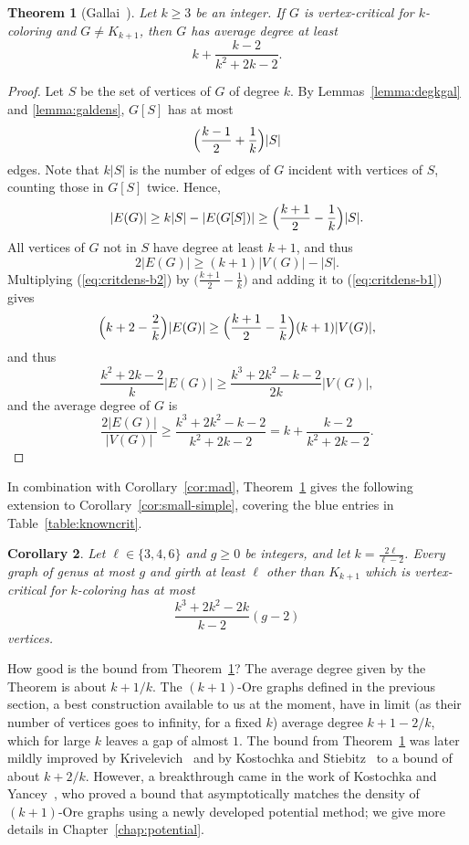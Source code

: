 \documentclass[12pt,twoside,openright,a4paper]{book}
\newtheorem{theorem}{Theorem}[chapter]
\newtheorem{corollary}[theorem]{Corollary}
\begin{document}
\begin{theorem}[Gallai~\cite{galfor}]\label{thm:critdens}
Let $k\ge 3$ be an integer.  If $G$ is vertex-critical for $k$-coloring and $G\neq K_{k+1}$, then $G$ has average degree
at least
$$k+\frac{k-2}{k^2+2k-2}.$$
\end{theorem}
\begin{proof}
Let $S$ be the set of vertices of $G$ of degree $k$.  By Lemmas~\ref{lemma:degkgal} and \ref{lemma:galdens},
$G[S]$ has at most $$\Bigl(\frac{k-1}{2}+\frac{1}{k}\Bigr)|S|$$ edges.  Note that $k|S|$ is the number of edges of $G$ incident with vertices of $S$,
counting those in $G[S]$ twice.  Hence,
\begin{equation}\label{eq:critdens-b1}
|E(G)|\ge k|S|-|E(G[S])|\ge \Bigl(\frac{k+1}{2}-\frac{1}{k}\Bigr)|S|.
\end{equation}
All vertices of $G$ not in $S$ have degree at least $k+1$, and thus
\begin{equation}\label{eq:critdens-b2}
2|E(G)|\ge (k+1)|V(G)|-|S|.
\end{equation}
Multiplying (\ref{eq:critdens-b2}) by $\bigl(\tfrac{k+1}{2}-\tfrac{1}{k}\bigr)$ and adding it to (\ref{eq:critdens-b1}) gives
$$\Bigl(k+2-\frac{2}{k}\Bigr)|E(G)|\ge\Bigl(\frac{k+1}{2}-\frac{1}{k}\Bigr)(k+1)|V(G)|,$$
and thus
$$\frac{k^2+2k-2}{k}|E(G)|\ge\frac{k^3+2k^2-k-2}{2k}|V(G)|,$$
and the average degree of $G$ is
$$\frac{2|E(G)|}{|V(G)|}\ge \frac{k^3+2k^2-k-2}{k^2+2k-2}=k+\frac{k-2}{k^2+2k-2}.$$
\end{proof}
In combination with Corollary~\ref{cor:mad}, Theorem~\ref{thm:critdens} gives the following extension to Corollary~\ref{cor:small-simple}, covering the blue entries in Table~\ref{table:knowncrit}.
\begin{corollary}\label{cor:small-medium}
Let $\ell\in\{3,4,6\}$ and $g\ge 0$ be integers, and let $k=\tfrac{2\ell}{\ell-2}$.  Every graph of genus at most $g$ and girth at least $\ell$
other than $K_{k+1}$ which is vertex-critical for $k$-coloring has at most $$\frac{k^3+2k^2-2k}{k-2}(g-2)$$ vertices.
\end{corollary}

How good is the bound from Theorem~\ref{thm:critdens}?  The average degree given by the Theorem is about $k+1/k$.
The $(k+1)$-Ore graphs defined in the previous section, a best construction available to us at the moment,
have in limit (as their number of vertices goes to infinity, for a fixed $k$) average degree $k+1-2/k$, which for large $k$ leaves a gap of almost $1$.
The bound from Theorem~\ref{thm:critdens} was later mildly improved by Krivelevich~\cite{krivelevich1997minimal}
and by Kostochka and Stiebitz~\cite{kostochka1996excess} to a bound of about $k+2/k$.  However, a breakthrough came in the work of Kostochka and Yancey~\cite{koyanore},
who proved a bound that asymptotically matches the density of $(k+1)$-Ore graphs using a newly developed potential method; we give more details in Chapter~\ref{chap:potential}.
\end{document}
